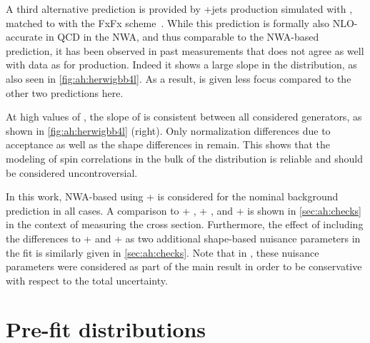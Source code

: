 A third alternative prediction is provided by \ttbar+jets production simulated with \amcatnlo, matched to \pythia with the FxFx scheme~\cite{Frederix:2012ps}. While this prediction is formally also NLO-accurate in QCD in the NWA, and thus comparable to the NWA-based \powheg prediction, it has been observed in past measurements that \amcatnlo does not agree as well with data as \powheg for \ttbar production. Indeed it shows a large slope in the \mtt distribution, as also seen in \cref{fig:ah:herwigbb4l}. As a result, \amcatnlo is given less focus compared to the other two predictions here.

At high values of \mtt, the slope of \chel is consistent between all considered generators, as shown in \cref{fig:ah:herwigbb4l} (right). Only normalization differences due to acceptance as well as the shape differences in \mtt remain. This shows that the modeling of spin correlations in the bulk of the \mtt distribution is reliable and should be considered uncontroversial.

In this work, NWA-based \ttbar using \powheg + \pythia is considered for the nominal background prediction in all cases. A comparison to \powheg + \herwig, \amcatnlo + \pythia, and \bbfourl + \pythia is shown in \cref{sec:ah:checks} in the context of measuring the \etat cross section. Furthermore, the effect of including the differences to \powheg + \herwig and \bbfourl + \pythia as two additional shape-based nuisance parameters in the fit is similarly given in \cref{sec:ah:checks}. Note that in , these nuisance parameters were considered as part of the main result in order to be conservative with respect to the total uncertainty.

\section{Pre-fit distributions}
\label{sec:ah:prefit}


